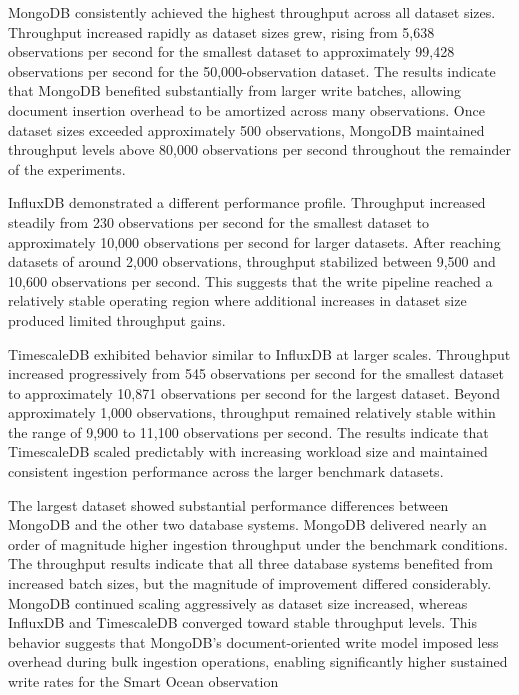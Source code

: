 MongoDB consistently achieved the highest throughput across all dataset sizes. Throughput increased rapidly as dataset sizes grew, rising from 5,638 observations per second for the smallest dataset to approximately 99,428 observations per second for the 50,000-observation dataset. The results indicate that MongoDB benefited substantially from larger write batches, allowing document insertion overhead to be amortized across many observations. Once dataset sizes exceeded approximately 500 observations, MongoDB maintained throughput levels above 80,000 observations per second throughout the remainder of the experiments.

InfluxDB demonstrated a different performance profile. Throughput increased steadily from 230 observations per second for the smallest dataset to approximately 10,000 observations per second for larger datasets. After reaching datasets of around 2,000 observations, throughput stabilized between 9,500 and 10,600 observations per second. This suggests that the write pipeline reached a relatively stable operating region where additional increases in dataset size produced limited throughput gains.

TimescaleDB exhibited behavior similar to InfluxDB at larger scales. Throughput increased progressively from 545 observations per second for the smallest dataset to approximately 10,871 observations per second for the largest dataset. Beyond approximately 1,000 observations, throughput remained relatively stable within the range of 9,900 to 11,100 observations per second. The results indicate that TimescaleDB scaled predictably with increasing workload size and maintained consistent ingestion performance across the larger benchmark datasets.

The largest dataset showed substantial performance differences between MongoDB and the other two database systems. MongoDB delivered nearly an order of magnitude higher ingestion throughput under the benchmark conditions. The throughput results indicate that all three database systems benefited from increased batch sizes, but the magnitude of improvement differed considerably. MongoDB continued scaling aggressively as dataset size increased, whereas InfluxDB and TimescaleDB converged toward stable throughput levels. This behavior suggests that MongoDB's document-oriented write model imposed less overhead during bulk ingestion operations, enabling significantly higher sustained write rates for the Smart Ocean observation 

